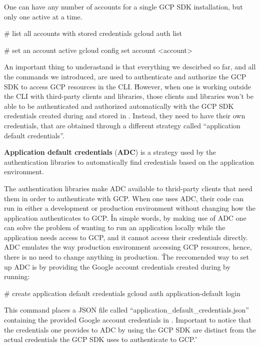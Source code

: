 One can have any number of accounts for a single GCP SDK installation, but only one active at a time.

\begin{bash}
# list all accounts with stored credentials
gcloud auth list
\end{bash}

\begin{bash}
# set an account active
gcloud config set account <account>
\end{bash}

An important thing to underastand is that everything we descirbed so far, and all the commands we introduced,
are used to authenticate and authorize the GCP SDK to access GCP resources in the CLI. \v

However, when one is working outside the CLI with third-party clients and libraries, those clients and libraries
won't be able to be authenticated and authorized automatically with the GCP SDK credentials created during
 and stored in . Instead, they need to have their own credentials,
that are obtained through a different strategy called ``application default credentials''.

\textbf{Application default credentials} (\textbf{ADC}) is a strategy used by the authentication libraries to
automatically find credentials based on the application environment.
\ed

The authentication libraries make ADC available to thrid-party clients that need them in order to authenticate with
GCP\@. When one uses ADC, their code can run in either a development or production environment without changing how
the application authenticates to GCP. \v

In simple words, by making use of ADC one can solve the problem of wanting to run an application locally while the
application needs access to GCP, and it cannot access their credentials directly. ADC emulates the way production
environment accessing GCP resources, hence, there is no need to change anything in production. \v

The reccomended way to set up ADC is by providing the Google account credentials created during 
by running:
\begin{bash}
# create application default credentials
gcloud auth application-default login
\end{bash}

This command places a JSON file called ``application\_default\_credentials.json'' containing the provided Google
account credentials in . Important to notice that
the credentials one provides to ADC by using the GCP SDK are distinct from the actual credentials the GCP SDK uses
to authenticate to GCP\@. \v

